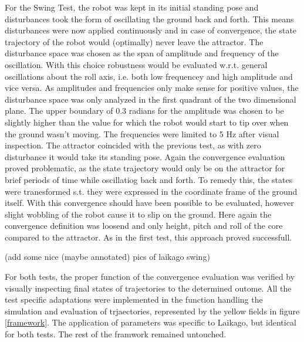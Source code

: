     For the Swing Test, the robot was kept in its initial standing pose and disturbances took the form of oscillating the ground back and forth. This means disturbances were now applied continuously and in case of convergence, the state trajectory of the robot would (optimally) never leave the attractor. The disturbance space was chosen as the span of amplitude and frequency of the oscillation. With this choice robustness would be evaluated w.r.t. general oscillations about the roll axis, i.e. both low frequencey and high amplitude and vice versa. As amplitudes and frequencies only make sense for positive values, the disturbance space was only analyzed in the first quadrant of the two dimensional plane. The upper boundary of $0.3$ radians for the amplitude was chosen to be slightly higher than the value for which the robot would start to tip over when the ground wasn't moving. The frequencies were limited to 5 Hz after visual inspection. 
    The attractor coincided with the previous test, as with zero disturbance it would take its standing pose. 
    Again the convergence evaluation proved problematic, as the state trajectory would only be on the attractor for brief periods of time while oscillatiog back and forth. To remedy this, the states were tranesformed s.t. they were expressed in the coordinate frame of the ground itself. With this convergence should have been possible to be evaluated, however slight wobbling of the robot cause it to slip on the ground. Here again the convergence definition was loosend and only height, pitch and roll of the core compared to the attractor. As in the first test, this approach proved successfull. 

    (add some nice (maybe annotated) pics of laikago swing)


    For both tests, the proper function of the convergence evaluation was verified by visually inspecting final states of trajectories to the determined outome. All the test specific adaptations were implemented in the function handling the simulation and evaluation of trjaectories, represented by the yellow fields in figure \ref{framework}. The application of parameters was specific to Laikago, but identical for both tests. The rest of the framwork remained untouched.








    
